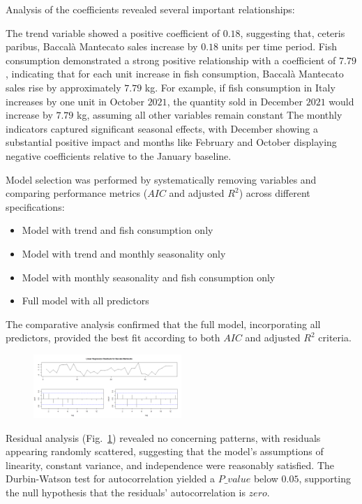 \documentclass[10pt,twocolumn,letterpaper]{article}
\begin{document}
Analysis of the coefficients revealed several important relationships:

The trend variable showed a positive coefficient of $0.18$, suggesting that, ceteris paribus, Baccalà Mantecato sales increase by $0.18$ units per time period.
Fish consumption demonstrated a strong positive relationship with a coefficient of $7.79$, indicating that for each unit increase in fish consumption, Baccalà Mantecato sales rise by approximately $7.79$ kg. For example, if fish consumption in Italy increases by one unit in October $2021$, the quantity sold in December $2021$ would increase by $7.79$ kg, assuming all other variables remain constant
The monthly indicators captured significant seasonal effects, with December showing a substantial positive impact and months like February and October displaying negative coefficients relative to the January baseline.

Model selection was performed by systematically removing variables and comparing performance metrics ($AIC$ and adjusted $R^2$) across different specifications:
\begin{itemize}[noitemsep, topsep=0pt]
    \item Model with trend and fish consumption only
    \item Model with trend and monthly seasonality only
    \item Model with monthly seasonality and fish consumption only
    \item Full model with all predictors
\end{itemize}
The comparative analysis confirmed that the full model, incorporating all predictors, provided the best fit according to both $AIC$ and adjusted $R^2$ criteria.

\begin{figure}[H]
    \centering
    \includegraphics[width=0.5\textwidth]{PlotsBEFD/RES_LR_MAN.png} 
    \caption{}
    \label{fig:RES_LR_MAN}
\end{figure}

Residual analysis (Fig.~\ref{fig:RES_LR_MAN}) revealed no concerning patterns, with residuals appearing randomly scattered, suggesting that the model's assumptions of linearity, constant variance, and independence were reasonably satisfied. The Durbin-Watson test for autocorrelation yielded a $P\_value$ below $0.05$, supporting the null hypothesis that the residuals' autocorrelation is $zero$.
\end{document}
